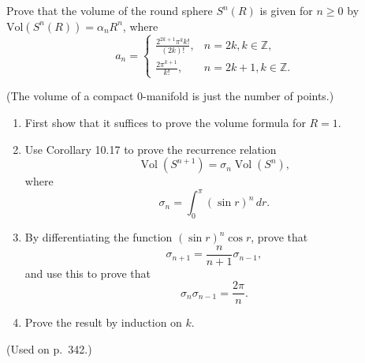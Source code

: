 \begin{exercise}
\label{prob:volume-formula-spheres}

Prove that the volume of the round sphere $S^n(R)$ is given for $n \ge 0$ by $\text{Vol}(S^n(R)) = \alpha_n R^n$, where
\[
a_n = \begin{cases}
\frac{2^{2k+1} \pi^k k!}{(2k)!}, & n = 2k, k \in \mathbb{Z}, \\
\frac{2\pi^{k+1}}{k!}, & n = 2k+1, k \in \mathbb{Z}.
\end{cases}
\]

(The volume of a compact 0-manifold is just the number of points.)

\begin{enumerate}
\item[(a)] First show that it suffices to prove the volume formula for $R = 1$.
\item[(b)] Use Corollary 10.17 to prove the recurrence relation
\[
\operatorname{Vol}(S^{n+1}) = \sigma_n \operatorname{Vol}(S^n),
\]
where
\[
\sigma_n = \int_0^{\pi} (\sin r)^n \, dr.
\]
\item[(c)] By differentiating the function $(\sin r)^n \cos r$, prove that
\[
\sigma_{n+1} = \frac{n}{n+1} \sigma_{n-1},
\]
and use this to prove that
\[
\sigma_n \sigma_{n-1} = \frac{2\pi}{n}.
\]
\item[(d)] Prove the result by induction on $k$.
\end{enumerate}

(Used on p.~342.)
\end{exercise}
